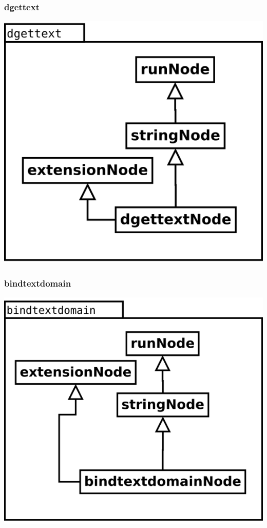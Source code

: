 \subsubsection {dgettext}
\begin{center}
\includegraphics[scale=0.4]{dgettext.png} \\
\end{center}

\subsubsection {bindtextdomain}
\begin{center}
\includegraphics[scale=0.4]{bindtextdomain.png} \\
\end{center}

